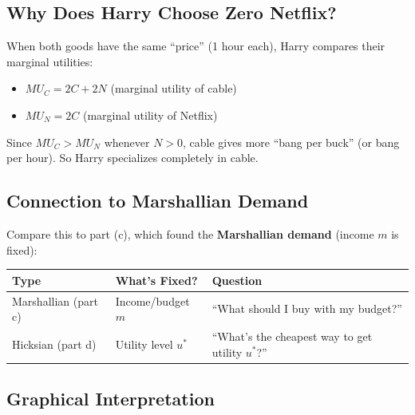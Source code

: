 \documentclass[11pt]{article}
\begin{document}
\subsection{Why Does Harry Choose Zero Netflix?}

When both goods have the same ``price'' (1 hour each), Harry compares their marginal utilities:
\begin{itemize}
    \item $MU_C = 2C + 2N$ (marginal utility of cable)
    \item $MU_N = 2C$ (marginal utility of Netflix)
\end{itemize}

Since $MU_C > MU_N$ whenever $N > 0$, cable gives more ``bang per buck'' (or bang per hour). So Harry specializes completely in cable.

\subsection{Connection to Marshallian Demand}

Compare this to part (c), which found the \textbf{Marshallian demand} (income $m$ is fixed):

\begin{center}
\begin{tabular}{|l|l|l|}
\hline
\textbf{Type} & \textbf{What's Fixed?} & \textbf{Question} \\
\hline
Marshallian (part c) & Income/budget $m$ & ``What should I buy with my budget?'' \\
Hicksian (part d) & Utility level $u^*$ & ``What's the cheapest way to get utility $u^*$?'' \\
\hline
\end{tabular}
\end{center}

\subsection{Graphical Interpretation}
\end{document}
